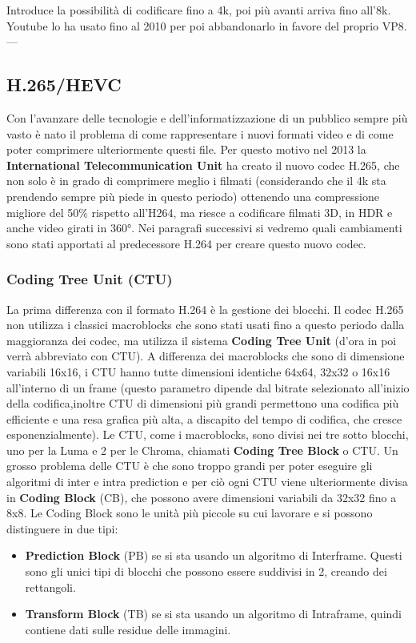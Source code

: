 \documentclass[a4paper,12pt, oneside]{article}
\begin{document}
Introduce la possibilità di codificare fino a 4k, poi più avanti arriva fino all'8k.
Youtube lo ha usato fino al 2010 per poi abbandonarlo in favore del proprio VP8.
---

\subsection{H.265/HEVC}
Con l'avanzare delle tecnologie e dell'informatizzazione di un pubblico sempre più vasto
è nato il problema di come rappresentare i nuovi formati video e di come poter comprimere ulteriormente
questi file. Per questo motivo nel 2013 la \textbf{International Telecommunication Unit} ha creato il
nuovo codec H.265, che non solo è in grado di comprimere meglio i filmati (considerando che il 4k sta
prendendo sempre più piede in questo periodo) ottenendo una compressione migliore del 50\% rispetto all'H264, ma
riesce a codificare filmati 3D, in HDR e anche video girati in 360°. Nei paragrafi successivi si vedremo quali
cambiamenti sono stati apportati al predecessore H.264 per creare questo nuovo codec.

\subsubsection{Coding Tree Unit (CTU)}
La prima differenza con il formato H.264 è la gestione dei blocchi. Il codec H.265 non utilizza
i classici macroblocks che sono stati usati fino a questo periodo dalla maggioranza dei codec, ma
utilizza il sistema \textbf{Coding Tree Unit} (d'ora in poi verrà abbreviato con CTU). A differenza
dei macroblocks che sono di dimensione variabili 16x16, i CTU hanno tutte dimensioni identiche
64x64, 32x32 o 16x16 all'interno di un frame (questo parametro dipende dal bitrate selezionato all'inizio
della codifica,inoltre CTU di dimensioni più grandi permettono una codifica più efficiente e una resa
grafica più alta, a discapito del tempo di codifica, che cresce esponenzialmente). Le CTU, come i
macroblocks, sono divisi nei tre sotto blocchi, uno per la Luma e 2 per le Chroma, chiamati \textbf{Coding Tree Block} o CTU.
Un grosso problema delle CTU è che sono troppo grandi per poter eseguire gli algoritmi di inter e intra
prediction e per ciò ogni CTU viene ulteriormente divisa in \textbf{Coding Block} (CB), che possono avere
dimensioni variabili da 32x32 fino a 8x8.
Le Coding Block sono le unità più piccole su cui lavorare e si possono distinguere in due tipi:

\begin{itemize}
    \item \textbf{Prediction Block} (PB) se si sta usando un algoritmo di Interframe. Questi sono
    gli unici tipi di blocchi che possono essere suddivisi in 2, creando dei rettangoli.
    \item \textbf{Transform Block} (TB) se si sta usando un algoritmo di Intraframe, quindi contiene
    dati sulle residue delle immagini.
\end{itemize}
\end{document}
